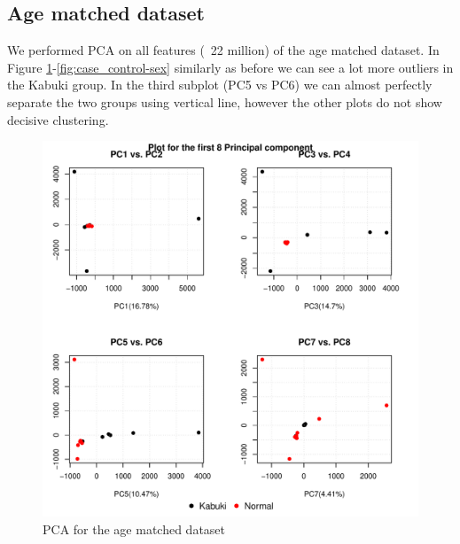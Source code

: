 \subsection{Age matched dataset}
We performed PCA on all features (~22 million) of the age matched dataset. In Figure \ref{fig:case_control}-\ref{fig:case_control-sex} similarly as before we can see a lot more outliers in the Kabuki group. In the third subplot (PC5 vs PC6) we can almost perfectly separate the two groups using vertical line, however the other plots do not show decisive clustering.
\
\begin{figure}[!h]
    \centering
    \includegraphics[width=\textwidth]{figures/PCA/case_control/pca_plot.pdf}
    \caption{PCA for the age matched dataset}
    \label{fig:case_control}
\end{figure}

